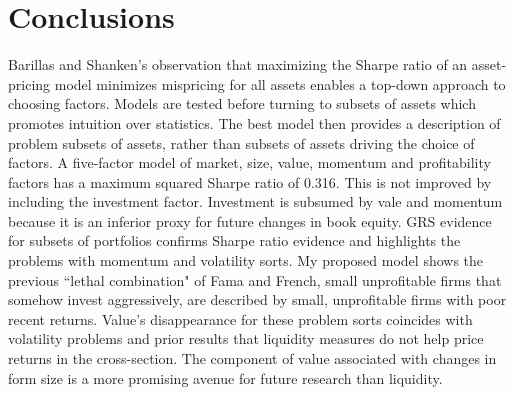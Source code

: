 
\section*{Conclusions}

Barillas and Shanken’s observation that maximizing the Sharpe ratio of an
asset-pricing model minimizes mispricing for all assets enables a top-down
approach to choosing factors.
Models are tested before turning to subsets of assets which promotes intuition
over statistics.
The best model then provides a description of problem subsets of assets,
rather than subsets of assets driving the choice of factors.
A five-factor model of market, size, value, momentum and profitability factors
has a maximum squared Sharpe ratio of 0.316.
This is not improved by including the investment factor.
Investment is subsumed by vale and momentum because it is an inferior proxy
for future changes in book equity.
GRS evidence for subsets of portfolios confirms Sharpe ratio evidence and
highlights the problems with momentum and volatility sorts.
My proposed model shows the previous ``lethal combination" of Fama and French,
small unprofitable firms that somehow invest aggressively,
are described by small, unprofitable firms with poor recent returns.
Value’s disappearance for these problem sorts coincides with volatility
problems and prior results that liquidity measures do not help price returns
in the cross-section.
The component of value associated with changes in form size is a more
promising avenue for future research than liquidity.
